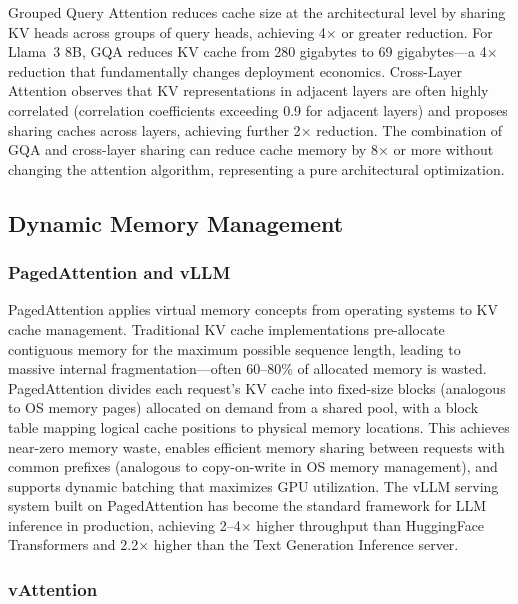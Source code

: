 \documentclass[11pt,letterpaper]{article}
\begin{document}
Grouped Query Attention \cite{ainslie2023gqa} reduces cache size at the architectural level by sharing KV heads across groups of query heads, achieving 4$\times$ or greater reduction. For Llama~3 8B, GQA reduces KV cache from 280 gigabytes to 69 gigabytes---a 4$\times$ reduction that fundamentally changes deployment economics. Cross-Layer Attention \cite{brandon2024reducing} observes that KV representations in adjacent layers are often highly correlated (correlation coefficients exceeding 0.9 for adjacent layers) and proposes sharing caches across layers, achieving further 2$\times$ reduction. The combination of GQA and cross-layer sharing can reduce cache memory by 8$\times$ or more without changing the attention algorithm, representing a pure architectural optimization.

\subsection{Dynamic Memory Management}

\subsubsection{PagedAttention and vLLM}

PagedAttention \cite{kwon2023efficient} applies virtual memory concepts from operating systems to KV cache management. Traditional KV cache implementations pre-allocate contiguous memory for the maximum possible sequence length, leading to massive internal fragmentation---often 60--80\% of allocated memory is wasted. PagedAttention divides each request's KV cache into fixed-size blocks (analogous to OS memory pages) allocated on demand from a shared pool, with a block table mapping logical cache positions to physical memory locations. This achieves near-zero memory waste, enables efficient memory sharing between requests with common prefixes (analogous to copy-on-write in OS memory management), and supports dynamic batching that maximizes GPU utilization. The vLLM serving system built on PagedAttention has become the standard framework for LLM inference in production, achieving 2--4$\times$ higher throughput than HuggingFace Transformers and 2.2$\times$ higher than the Text Generation Inference server.

\subsubsection{vAttention}
\end{document}
